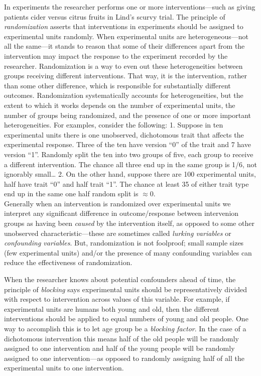 \documentclass[
]{book}
\theoremstyle{definition}
\theoremstyle{definition}
\theoremstyle{definition}
\theoremstyle{definition}
\theoremstyle{remark}
\begin{document}
In experiments the researcher performs one or more interventions---such as giving patients cider versus citrus fruits in Lind's scurvy trial. The principle of \emph{randomization} asserts that interventions in experiments should be assigned to experimental units randomly. When experimental units are heterogeneous---not all the same---it stands to reason that some of their differences apart from the intervention may impact the response to the experiment recorded by the researcher. Randomization is a way to even out these heterogeneities between groups receiving different interventions. That way, it is the intervention, rather than some other difference, which is responsible for substantially different outcomes. Randomization systematically accounts for heterogeneities, but the extent to which it works depends on the number of experimental units, the number of groups being randomized, and the presence of one or more important heterogeneities. For examples, consider the following:
1. Suppose in ten experimental units there is one unobserved, dichotomous trait that affects the experimental response. Three of the ten have version ``0'' of the trait and 7 have version ``1''. Randomly split the ten into two groups of five, each group to receive a different intervention. The chance all three end up in the same group is 1/6, not ignorably small\ldots{}
2. On the other hand, suppose there are 100 experimental units, half have trait ``0'' and half trait ``1''. The chance at least 35 of either trait type end up in the same one half random split is \(\approx 0\).\\
Generally when an intervention is randomized over experimental units we interpret any significant difference in outcome/response between intervenion groups as having been \emph{caused} by the intervention itself, as opposed to some other unobserved characteristic---these are sometimes called \emph{lurking variables} or \emph{confounding variables}. But, randomization is not foolproof; small sample sizes (few experimental units) and/or the presence of many confounding variables can reduce the effectiveness of randomization.

When the researcher knows about potential confounders ahead of time, the principle of \emph{blocking} says experimental units should be representatively divided with respect to intervention across values of this variable. For example, if experimental units are humans both young and old, then the different interventions should be applied to equal numbers of young and old people. One way to accomplish this is to let age group be a \emph{blocking factor}. In the case of a dichotomous intervention this means half of the old people will be randomly assigned to one intervention and half of the young people will be randomly assigned to one intervention---as opposed to randomly assigning half of all the experimental units to one intervention.
\end{document}
